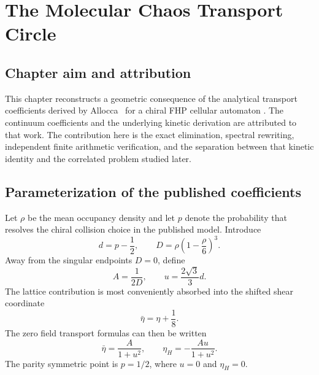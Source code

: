 \chapter{The Molecular Chaos Transport Circle}\label{ch:kinetic}

\section{Chapter aim and attribution}
This chapter reconstructs a geometric consequence of the analytical transport coefficients derived by Allocca \etal\ for a chiral FHP cellular automaton \cite{Allocca2026}. The continuum coefficients and the underlying kinetic derivation are attributed to that work. The contribution here is the exact elimination, spectral rewriting, independent finite arithmetic verification, and the separation between that kinetic identity and the correlated problem studied later.

\section{Parameterization of the published coefficients}
Let $\rho$ be the mean occupancy density and let $p$ denote the probability that resolves the chiral collision choice in the published model. Introduce
\begin{equation}
 d=p-\frac12,
 \qquad
 D=\rho\left(1-\frac{\rho}{6}\right)^3.
 \label{eq:kin_D}
\end{equation}
Away from the singular endpoints $D=0$, define
\begin{equation}
 A=\frac{1}{2D},
 \qquad
 u=\frac{2\sqrt3}{3}d.
 \label{eq:kin_Au}
\end{equation}
The lattice contribution is most conveniently absorbed into the shifted shear coordinate
\begin{equation}
 \bar\eta=\eta+\frac18.
 \label{eq:eta_shift}
\end{equation}
The zero field transport formulas can then be written
\begin{equation}
 \bar\eta=\frac{A}{1+u^2},
 \qquad
 \eta_H=-\frac{Au}{1+u^2}.
 \label{eq:kin_coeffs}
\end{equation}
The parity symmetric point is $p=1/2$, where $u=0$ and $\eta_H=0$.

